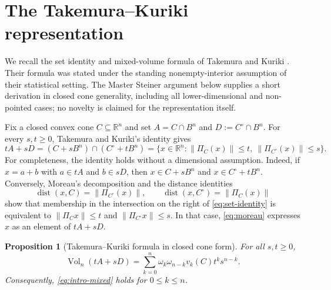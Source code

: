\documentclass[12pt,a4paper]{article}
\numberwithin{equation}{section}
\newtheorem{proposition}[proposition]{Proposition}
\theoremstyle{definition}
\theoremstyle{remark}
\newcommand{\R}{\mathbb{R}}
\newcommand{\vol}{\operatorname{Vol}}
\begin{document}
\section{The Takemura--Kuriki representation}\label{sec:mixed}
We recall the set identity and mixed-volume formula of Takemura and
Kuriki \cite[Lemma~2.1 and Theorem~2.1]{TakemuraKuriki}.  Their formula was stated under the standing nonempty-interior assumption of their
statistical setting.  The Master Steiner argument below supplies a short derivation in closed cone generality, including all lower-dimensional and non-pointed cases; no novelty is claimed for the representation itself.

Fix a closed convex cone $C\subseteq\R^n$ and set $A=C\cap B^n$ and $D:=C^\circ\cap B^n$. For every $s,t\ge0$, Takemura and Kuriki's identity
\cite[Lemma~2.1]{TakemuraKuriki} gives
\begin{equation}\label{eq:set-identity}
 tA+sD
 =(C+sB^n)\cap(C^\circ+tB^n)
 =\{x\in\R^n:\|\Pi_C(x)\|\le t,
                  \ \|\Pi_{C^\circ}(x)\|\le s\}.
\end{equation}
For completeness, the identity holds without a dimensional
assumption.  Indeed, if $x=a+b$ with $a\in tA$ and $b\in sD$, then
$x\in C+sB^n$ and $x\in C^\circ+tB^n$.  Conversely, Moreau's
decomposition and the distance identities
\[
 \operatorname{dist}(x,C)=\|\Pi_{C^\circ}(x)\|,
 \qquad
 \operatorname{dist}(x,C^\circ)=\|\Pi_C(x)\|
\]
show that membership in the intersection on the right of
\eqref{eq:set-identity} is equivalent to
$\|\Pi_Cx\|\le t$ and $\|\Pi_{C^\circ}x\|\le s$.  In that case,
\eqref{eq:moreau} expresses $x$ as an element of $tA+sD$.

\begin{proposition}[Takemura--Kuriki formula in closed cone form]
For all $s,t\ge0$,
\begin{equation}\label{eq:intro-volume}
 \vol_n(tA+sD)=\sum_{k=0}^n
 \omega_k\omega_{n-k}v_k(C)t^ks^{n-k}.
\end{equation}
Consequently, \eqref{eq:intro-mixed} holds for $0\le k\le n$.
\end{proposition}
\end{document}
